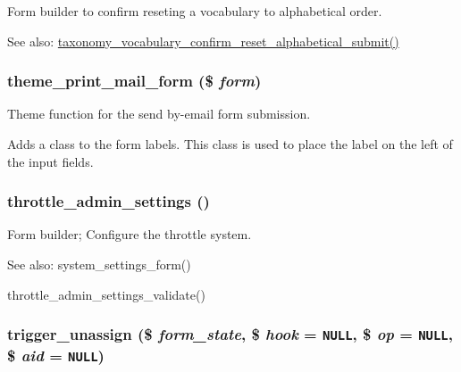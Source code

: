 Form builder to confirm reseting a vocabulary to alphabetical order.

\begin{Desc}
\item[See also:]\hyperlink{taxonomy_8admin_8inc_682c533b8249e033ce7e612550c9b68d}{taxonomy\_\-vocabulary\_\-confirm\_\-reset\_\-alphabetical\_\-submit()} \end{Desc}
\hypertarget{group__forms_gdfd29c42f8222a01806b51c82db1a71b}{
\subsubsection[{theme\_\-print\_\-mail\_\-form}]{\setlength{\rightskip}{0pt plus 5cm}theme\_\-print\_\-mail\_\-form (\$ {\em form})}}
\label{group__forms_gdfd29c42f8222a01806b51c82db1a71b}


Theme function for the send by-email form submission.

Adds a class to the form labels. This class is used to place the label on the left of the input fields. \hypertarget{group__forms_g0eb8c200e818d57f21108249cd048621}{
\subsubsection[{throttle\_\-admin\_\-settings}]{\setlength{\rightskip}{0pt plus 5cm}throttle\_\-admin\_\-settings ()}}
\label{group__forms_g0eb8c200e818d57f21108249cd048621}


Form builder; Configure the throttle system.

\begin{Desc}
\item[See also:]system\_\-settings\_\-form() 

throttle\_\-admin\_\-settings\_\-validate() \end{Desc}
\hypertarget{group__forms_gc2c2d1e7054da26671a18e1a6d1e4631}{
\subsubsection[{trigger\_\-unassign}]{\setlength{\rightskip}{0pt plus 5cm}trigger\_\-unassign (\$ {\em form\_\-state}, \/  \$ {\em hook} = {\tt NULL}, \/  \$ {\em op} = {\tt NULL}, \/  \$ {\em aid} = {\tt NULL})}}
\label{group__forms_gc2c2d1e7054da26671a18e1a6d1e4631}


